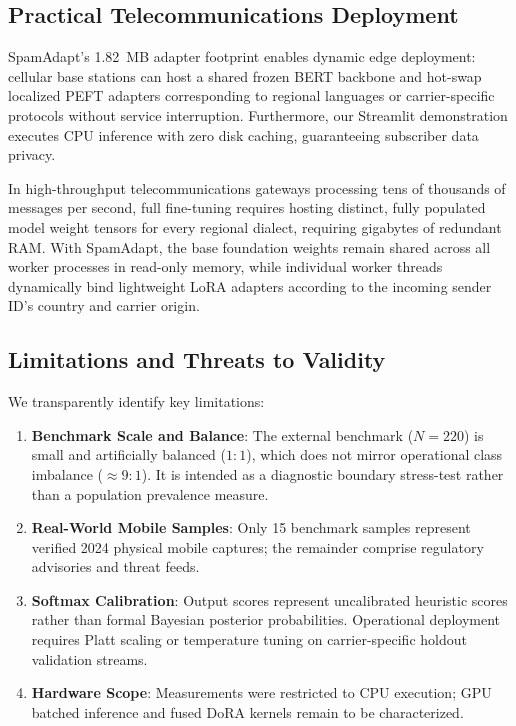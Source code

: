 \documentclass[conference]{IEEEtran}
\begin{document}
\subsection{Practical Telecommunications Deployment}
SpamAdapt's 1.82~MB adapter footprint enables dynamic edge deployment: cellular base stations can host a shared frozen BERT backbone and hot-swap localized PEFT adapters corresponding to regional languages or carrier-specific protocols without service interruption. Furthermore, our Streamlit demonstration executes CPU inference with zero disk caching, guaranteeing subscriber data privacy.

In high-throughput telecommunications gateways processing tens of thousands of messages per second, full fine-tuning requires hosting distinct, fully populated model weight tensors for every regional dialect, requiring gigabytes of redundant RAM. With SpamAdapt, the base foundation weights remain shared across all worker processes in read-only memory, while individual worker threads dynamically bind lightweight LoRA adapters according to the incoming sender ID's country and carrier origin.

\subsection{Limitations and Threats to Validity}
We transparently identify key limitations:
\begin{enumerate}
    \item \textbf{Benchmark Scale and Balance}: The external benchmark ($N=220$) is small and artificially balanced ($1:1$), which does not mirror operational class imbalance ($\approx 9:1$). It is intended as a diagnostic boundary stress-test rather than a population prevalence measure.
    \item \textbf{Real-World Mobile Samples}: Only 15 benchmark samples represent verified 2024 physical mobile captures; the remainder comprise regulatory advisories and threat feeds.
    \item \textbf{Softmax Calibration}: Output scores represent uncalibrated heuristic scores rather than formal Bayesian posterior probabilities. Operational deployment requires Platt scaling or temperature tuning on carrier-specific holdout validation streams.
    \item \textbf{Hardware Scope}: Measurements were restricted to CPU execution; GPU batched inference and fused DoRA kernels remain to be characterized.
\end{enumerate}
\end{document}

